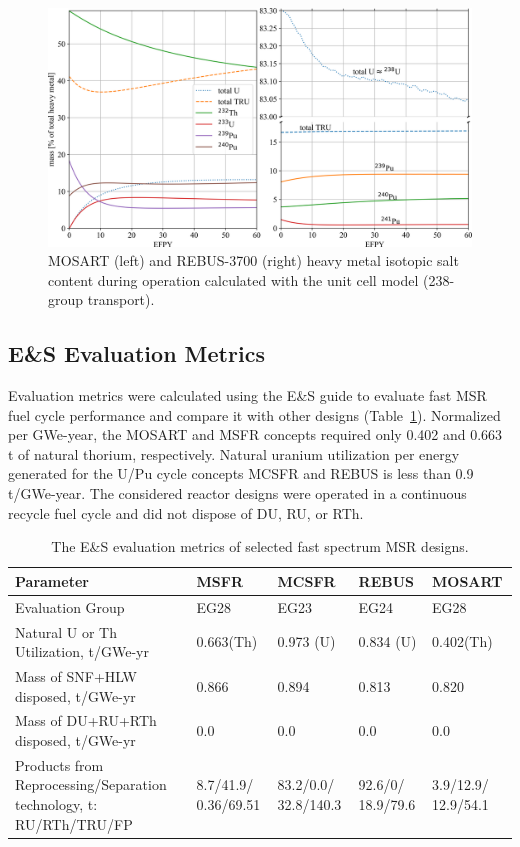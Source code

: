 \documentclass[letterpaper]{mandc2019}
\begin{document}
\begin{figure}[t!]
  \centering
  \includegraphics[width=\textwidth]{./Figures/mosart_rebus_balance.png}
  	  \vspace{-0.2in}
  \caption{\gls{MOSART} (left) and REBUS-3700 (right) heavy metal isotopic salt content during operation calculated with the unit cell model (238-group transport).}
  \label{fig:mosart-balance}
\end{figure}
\subsection{E\&S Evaluation Metrics}
Evaluation metrics were calculated using the E\&S guide \cite{wigeland_nuclear_2014-4} to evaluate fast \gls{MSR} fuel cycle performance and compare it with other designs (Table~\ref{table:metrics}). 
Normalized per GWe-year, the \gls{MOSART} and \gls{MSFR} concepts required only 0.402 and 0.663 t of natural thorium, respectively. 
Natural uranium utilization per energy generated for the U/Pu cycle concepts \gls{MCSFR} and REBUS is less than 0.9 t/GWe-year. 
The considered reactor designs were operated in a continuous recycle fuel cycle and did not dispose of DU, RU, or RTh.

\begin{table}[t!]
  \vspace{-0.5in}
  \centering
  \caption{The E\&S evaluation metrics of selected fast spectrum \gls{MSR} designs.}
  \label{table:metrics}
  \begin{tabular}{p{} p{} p{} p{} p{}} \toprule
   Parameter &  \gls{MSFR} & \gls{MCSFR} & REBUS & \gls{MOSART} \\ \midrule
   Evaluation Group	&  EG28 & EG23 & EG24 & EG28   \\
   Natural U or Th Utilization, t/GWe-yr & 0.663(Th) & 0.973 (U) & 0.834 (U) & 0.402(Th) \\
   Mass of \gls{SNF}+\gls{HLW} disposed, t/GWe-yr & 0.866 & 0.894 & 0.813 &  0.820 \\
   Mass of DU+RU+RTh disposed, t/GWe-yr & 0.0 & 0.0 & 0.0 &  0.0 \\
   Products from Reprocessing/Separation technology, t: \gls{RU}/\gls{RTh}/\gls{TRU}/\gls{FP} &
   8.7/41.9/ 0.36/69.51 &  83.2/0.0/ 32.8/140.3 & 92.6/0/ 18.9/79.6 & 3.9/12.9/ 12.9/54.1  \\
 \bottomrule
  \end{tabular}
\end{table}
\end{document}
